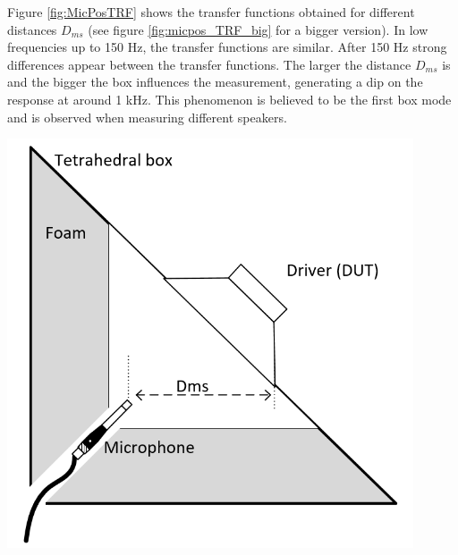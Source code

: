 \documentclass{report}
\begin{document}
Figure \ref{fig:MicPosTRF} shows the transfer functions obtained for different distances $D_{ms}$ (see figure \ref{fig:micpos_TRF_big} for a bigger version). In low frequencies up to 150 Hz, the transfer functions are similar. After 150 Hz strong differences appear between the transfer functions. The larger the distance $D_{ms}$ is and the bigger the box influences the measurement, generating a dip on the response at around 1 kHz. This phenomenon is believed to be the first box mode and is observed when measuring different speakers. \\

\begin{minipage}{0.35\textwidth}
\begin{center}
	\includegraphics[width=0.9\textwidth]{RoomComp/Mic_Pos_Schm} 
    \captionsetup{hypcap=false} 
	\label{fig:micpos_schema}
\end{center}
\end{minipage}
\end{document}
